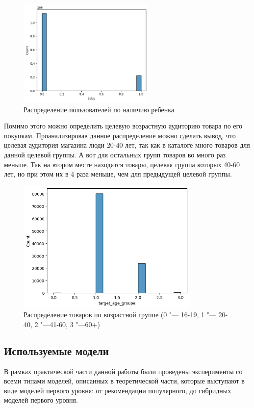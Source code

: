 \documentclass[bachelor, och, coursework]{SCWorks}
\begin{document}
\begin{figure}[H]
    \centering
    \includegraphics[width=0.6\textwidth]{pic/12}
    \caption{Распределение пользователей по наличию ребенка}
    \label{fig:img1}
\end{figure}

Помимо этого можно определить целевую возрастную аудиторию товара по его покупкам. Проанализировав данное распределение можно сделать вывод, что целевая аудитория магазина люди 20-40 лет, так как в каталоге много товаров для данной целевой группы. А вот для остальных групп товаров во много раз меньше. Так на втором месте находятся товары, целевая группа которых 40-60 лет, но при этом их в 4 раза меньше, чем для предыдущей целевой группы.

\begin{figure}[H]
    \centering
    \includegraphics[width=0.8\textwidth]{pic/13}
    \caption{Распределение товаров по возрастной группе (0 "--- 16-19, 1 "--- 20-40, 2 "---41-60, 3 "---60+)}
    \label{fig:img1}
\end{figure}

\subsection{Используемые модели}
В рамках практической части данной работы были проведены эксперименты со всеми типами моделей, описанных в теоретической части,
которые выступают в виде моделей первого уровня: от рекомендации популярного, до гибридных моделей первого уровня.
\end{document}
